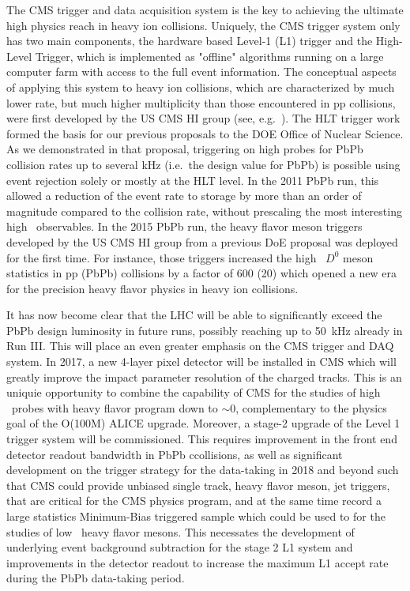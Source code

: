 The CMS trigger and data acquisition system is the key to achieving the ultimate high \pt physics reach in heavy ion collisions. Uniquely, the CMS trigger system only has two main components, the hardware based Level-1 (L1) trigger and the High-Level Trigger, which is implemented as "offline" algorithms running on a large computer farm with access to the full event information.  
The conceptual aspects of applying this system to heavy ion collisions, which are characterized by much lower rate, but much higher multiplicity than those encountered in pp collisions, were first developed by the US CMS HI group (see, e.g.\ \cite{Roland:2007is}). The HLT trigger work formed the basis for our previous proposals to the DOE Office of Nuclear Science. As we demonstrated in that proposal, triggering on high \pt probes for PbPb collision rates up to several kHz (i.e.\ the design value for PbPb) is possible using event rejection solely or mostly at the HLT level. In the 2011 PbPb run, this allowed a reduction of the event rate to storage by more than
an order of magnitude compared to the collision rate, without prescaling the most interesting high \pt\ observables. In the 2015 PbPb run, the heavy flavor meson triggers developed by the US CMS HI group from a previous DoE proposal was deployed for the first time. For instance, those triggers increased the high \pt\ $D^0$ meson statistics in pp (PbPb) collisions by a factor of 600 (20) which opened a new era for the precision heavy flavor physics in heavy ion collisions.

It has now become clear that the LHC will be able to significantly exceed the PbPb design luminosity in future runs, possibly reaching up to 50~kHz already in Run III. This will place an even greater emphasis on the CMS trigger and DAQ system. In 2017, a new 4-layer pixel detector will be installed in CMS which will greatly improve the impact parameter resolution of the charged tracks. This is an uniquie opportunity to combine the capability of CMS for the studies of high \pt\ probes with heavy flavor program down to \pt$\sim 0$, complementary to the physics goal of the O(100M) ALICE upgrade. Moreover, a stage-2 upgrade of the Level 1 trigger system will be commissioned. This requires improvement in the front end detector readout bandwidth in PbPb ccollisions, as well as significant development on the trigger strategy for the data-taking in 2018 and beyond such that CMS could provide unbiased single track, heavy flavor meson, jet triggers, that are critical for the CMS physics program, and at the same time record a large statistics Minimum-Bias triggered sample which could be used to for the studies of low \pt\ heavy flavor mesons. This necessates the development of underlying event background subtraction for the stage 2 L1 system and improvements in the detector readout to increase the maximum L1 accept rate during the PbPb data-taking period.

